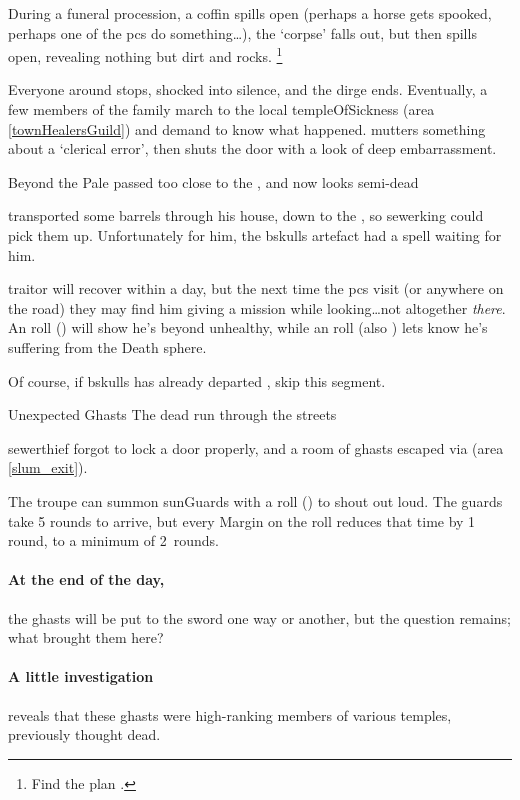 During a funeral procession, a coffin spills open (perhaps a horse gets spooked, perhaps one of the \glspl{pc} do something\ldots), the `corpse' falls out, but then spills open, revealing nothing but dirt and rocks.%
\footnote{Find the plan .}

Everyone around stops, shocked into silence, and the dirge ends.
Eventually, a few members of the family march to the local \gls{templeOfSickness} (area \vref{townHealersGuild}) and demand to know what happened.
 mutters something about a `clerical error', then shuts the door with a look of deep embarrassment.


  {Beyond the Pale}%
  { passed too close to the , and now looks semi-dead}%

\begin{exampletext}
   transported some barrels through his house, down to the , so \gls{sewerking} could pick them up.
  Unfortunately for him, the \gls{bskulls} \gls{artefact} had a spell waiting for him.
\end{exampletext}

\Gls{traitor} will recover within a day, but the next time the \glspl{pc} visit  (or anywhere on the road) they may find him giving a mission while looking\ldots not altogether \textit{there}.
An  roll (\tn[8]) will show he's beyond unhealthy, while an  roll (also \tn[8]) lets  know he's suffering from the Death \gls{sphere}.

Of course, if \gls{bskulls} has already departed , skip this \gls{segment}.

{Unexpected Ghasts}%
{The dead run through the streets}%

\Gls{sewerthief} forgot to lock a door properly, and a room of ghasts escaped via  (area \vref{slum_exit}).

The troupe can summon \glspl{sunGuard} with a  roll (\tn[7]) to shout out loud.
The guards take 5 \glspl{round} to arrive, but every Margin on the roll reduces that time by 1 \gls{round}, to a minimum of 2~\glspl{round}.

\paragraph{At the end of the day,}
the ghasts will be put to the sword one way or another, but the question remains; what brought them here?

\paragraph{A little investigation}
reveals that these ghasts were high-ranking members of various temples, previously thought dead.


